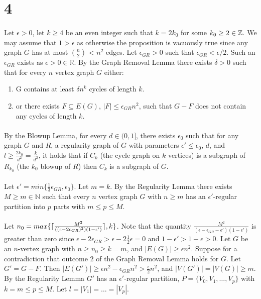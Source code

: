 \documentclass[letterpaper,12pt,oneside,onecolumn]{article}
\DeclarePairedDelimiter{\ceil}{\lceil}{\rceil}
\newcommand{\N}{\mathbb{N}} \newcommand{\R}{\mathbb{R}}
\begin{document}
\section*{4}
\paragraph{}
Let $\epsilon > 0$, let $k \geq 4$ be an even integer such that $k = 2k_0$ for some $k_0\geq 2 \in \mathbb{Z}$. We may assume that $1 > \epsilon$ as otherwise the proposition is vacuously true since any graph $G$ has at most $n \choose 2$ < $n^2$ edges. Let $\epsilon_{GR} > 0$ such that $\epsilon_{GR} < \epsilon/2$. Such an $\epsilon_{GR}$ exists as $\epsilon >0 \in \R$.  By the Graph Removal Lemma there exists $\delta > 0$ such that for every $n$ vertex graph $G$ either:
\begin{enumerate}
\item G contains at least $\delta n^k$ cycles of length $k$.\\
\item or there exists $F \subseteq E(G)$, $|F| \leq \epsilon_{GR} n^2$, such that $G - F$ does not contain any cycles of length $k$.
\end{enumerate}
\paragraph{}
By the Blowup Lemma, for every $d \in (0,1]$, there exists $\epsilon_0$ such that for any graph $G$ and $R$, a regularity graph of $G$ with parameters $\epsilon' \leq \epsilon_0$, $d$, and $l \geq \frac{2k_0}{d^2} = \frac{k}{d^2}$, it holds that if $C_k$ (the cycle graph on $k$ vertices) is a subgraph of $R_{k_0}$ (the $k_0$ blowup of $R$) then $C_k$ is a subgraph of $G$. 
\paragraph{}
Let $\epsilon' = min\{\frac{1}{3}\epsilon_{GR}, \epsilon_0\}$. Let $m = k$. By the Regularity Lemma there exists $M\geq m \in \N$ such that every $n$ vertex graph $G$ with $n \geq m$ has an $\epsilon'$-regular partition into $p$ parts with $m \leq p \leq M$.
\paragraph{}
Let $n_0 = max\{\ceil{\frac{M^2}{((\epsilon-2\epsilon_{GR})^2)(1-\epsilon')}}, k\}$. Note that the quantity $\frac{M^2}{(\epsilon-\epsilon_{GR}-\epsilon')(1-\epsilon')}$ is greater than zero since $\epsilon-2\epsilon_{GR} > \epsilon - 2\frac{1}{2}\epsilon = 0$ and $1-\epsilon' > 1-\epsilon > 0$. Let $G$ be an $n$-vertex graph with $n \geq n_0 \geq k = m$, and $|E(G)| \geq \epsilon n^2$. Suppose for a contradiction that outcome $2$ of the Graph Removal Lemma holds for $G$. Let $G' = G - F$. Then $|E(G')| \geq \epsilon n^2 - \epsilon_{GR} n^2 > \frac{\epsilon}{2}n^2$, and $|V(G')| = |V(G)| \geq m$. By the Regularity Lemma $G'$ has an $\epsilon'$-regular partition, $P=\{V_0, V_1, \dots, V_p\}$ with $k=m \leq p \leq M$. Let $l = |V_1| = \dots = |V_p|$.
\end{document}
